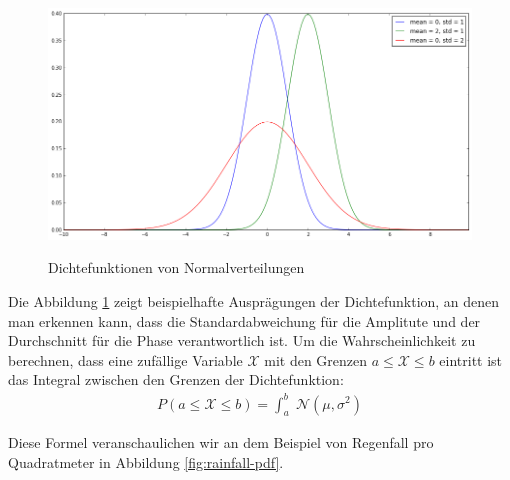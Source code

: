             \begin{figure}[H]
                    \begin{center}
                        \includegraphics[scale=0.38]{../pictures/diagrams/normal-dist-example.png}\\
                        \caption{Dichtefunktionen von Normalverteilungen}\label{fig:norm-dist-pdf}
                    \end{center}
            \end{figure}

            \noindent
            Die Abbildung \ref{fig:norm-dist-pdf} zeigt beispielhafte Ausprägungen der Dichtefunktion, an denen man erkennen kann, dass die Standardabweichung für die Amplitute und der Durchschnitt für die Phase verantwortlich ist. Um die Wahrscheinlichkeit zu berechnen, dass eine zufällige Variable $\mathcal{X}$  mit den Grenzen $a \leq \mathcal{X} \leq b$ eintritt ist das Integral zwischen den Grenzen der Dichtefunktion:
            \begin{align}
                P(a \leq \mathcal{X} \leq b) = \int_a^{b} \; \mathcal{N} (\mu, \sigma^2)
            \end{align}


            \noindent
            Diese Formel veranschaulichen wir an dem Beispiel von Regenfall pro Quadratmeter in Abbildung \ref{fig:rainfall-pdf}.


